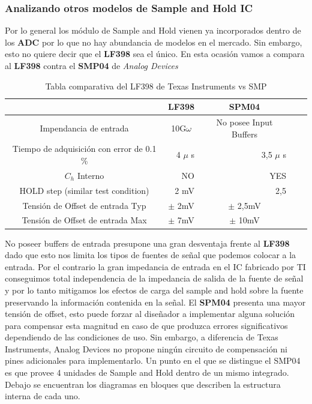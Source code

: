 \subsubsection{Analizando otros modelos de Sample and Hold IC}
Por lo general los módulo de Sample and Hold vienen ya incorporados dentro de los \textbf{ADC} por lo que no hay abundancia de modelos en el mercado. Sin embargo, esto no quiere decir que el \textbf{LF398} sea el único. En esta ocasión vamos a compara al \textbf{LF398} contra el \textbf{SMP04} de \textit{Analog Devices}
\begin{table}[H]
	\centering
	\begin{tabular}{ccccc}
		\toprule
		& \textbf{LF398}                & \textbf{SPM04}                  \\ \midrule
		Impendancia de entrada                     & 10G$\omega$                   & No posee
		Input Buffers      \\
		Tiempo de adquisición con error de  0.1 \% & \multicolumn{1}{r}{4 $\mu$ s} & \multicolumn{1}{r}{3,5 $\mu$ s} \\
		$C_h$ Interno                              & \multicolumn{1}{r}{NO}        & \multicolumn{1}{r}{YES}         \\
		HOLD step (similar test condition)         & \multicolumn{1}{r}{2 mV}      & \multicolumn{1}{r}{2,5}         \\
		Tensión de Offset de entrada Typ           & $\pm$ 2mV                     & $\pm$ 2,5mV                     \\
		Tensión de Offset de entrada Max           & $\pm$ 7mV                     & $\pm$ 10mV                      \\ \bottomrule
	\end{tabular}
	\caption{Tabla comparativa del LF398 de Texas Instruments vs SMP}
	\label{tab:sampleandholdcomparisson}
\end{table}

No poseer buffers de entrada presupone una gran desventaja frente al \textbf{LF398} dado que esto nos limita los tipos de fuentes de señal que podemos colocar a la entrada. Por el contrario la gran impedancia de entrada en el IC fabricado por TI conseguimos total independencia de la impedancia de salida de la fuente de señal y por lo tanto mitigamos los efectos de carga del sample and hold sobre la fuente preservando la información contenida en la señal.  
El \textbf{SPM04} presenta una mayor tensión de offset, esto puede forzar al diseñador a implementar alguna solución para compensar esta magnitud en caso de que produzca errores significativos dependiendo de las condiciones de uso. Sin embargo, a diferencia de Texas Instruments, Analog Devices no propone ningún circuito de compensación ni pines adicionales para implementarlo. 
Un punto en el que se distingue el SMP04 es que provee 4 unidades de Sample and Hold dentro de un mismo integrado.
Debajo se encuentran los diagramas en bloques que describen la estructura interna de cada uno.

